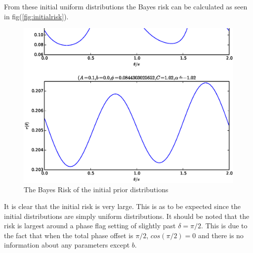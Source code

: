 From these initial uniform distributions the Bayes risk can be calculated as seen in fig(\ref{fig:initialrisk}).
\begin{figure}[ht!]
\centering
\includegraphics[scale=1.0]{Figures/risks1.eps}
\caption{The Bayes Risk of the initial prior distributions}
\label{fig:initialdistributions}
\end{figure}
It is clear that the initial risk is very large. This is as to be expected since the initial distributions are simply uniform distributions. It should be noted that the risk is largest around a phase flag setting of slightly  past $\delta=\pi/2$. This is due to the fact that when the total phase offset is $\pi/2$, $cos(\pi/2)=0$ and there is no information about any parameters except $b$. 

